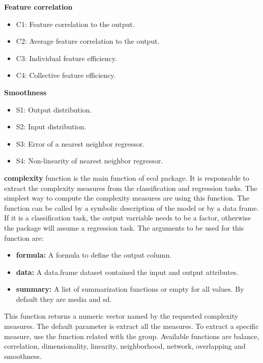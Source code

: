 \textbf{Feature correlation}

\begin{itemize}
    \item C1: Feature correlation to the output.
    \item C2: Average feature correlation to the output.
    \item C3: Individual feature efficiency.
    \item C4: Collective feature efficiency.
\end{itemize}

\textbf{Smoothness}

\begin{itemize}
    \item S1: Output distribution.
    \item S2: Input distribution.
    \item S3: Error of a nearest neighbor regressor.
    \item S4: Non-linearity of nearest neighbor regressor.
\end{itemize}

\textbf{complexity} function is the main function of \acrshort{ecol} package. It is responsable to extract the complexity measures from the classification and regression tasks. The simplest way to compute the complexity measures are using this function. The function can be called by a symbolic description of the model or by a data frame. If it is a classification task, the output varriable needs to be a factor, otherwise the package will assume a regression task. The arguments to be used for this function are:

\begin{itemize}
    \item \textbf{formula:} A formula to define the output column.
    \item \textbf{data:} A data.frame dataset contained the input and output attributes.
    \item \textbf{summary:} A list of summarization functions or empty for all values. By default they are media and \acrshort{sd}.
\end{itemize}

This function returns a numeric vector named by the requested complexity measures. The default parameter is extract all the measures. To extract a specific measure, use the function related with the group. Available functions are balance, correlation, dimensionality, linearity, neighborhood, network, overlapping and smoothness.

